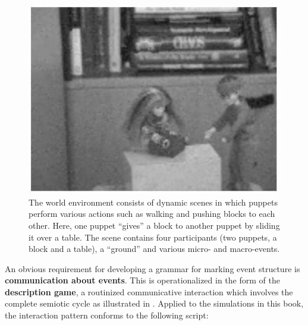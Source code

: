 \begin{figure}[p]
\centerline{\includegraphics[width=0.5\linewidth]{Chapter3/figs/puppets}}
  \caption[An example scene]{The world environment consists of dynamic scenes in which puppets perform various actions such as walking and pushing blocks to each other. Here, one puppet ``gives'' a block to another puppet by sliding it over a table. The scene contains four participants (two puppets, a block and a table), a ``ground'' and various micro- and macro-events.}
   \label{f:puppets}
\end{figure}

An obvious requirement for developing a grammar for marking event structure is {\bfseries communication about events}. This is operationalized in the form of the {\bfseries description game}, a routinized communicative interaction which involves the complete semiotic cycle as illustrated in . Applied to the simulations in this book, the interaction pattern conforms to the following script:

